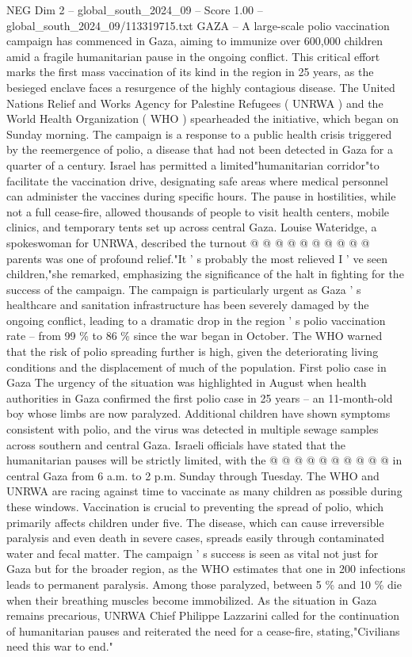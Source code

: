\begin{textsample}{NEG Dim 2 – global\_south\_2024\_09 – Score 1.00 – global\_south\_2024\_09/113319715.txt}  \label{ex:f2_neg_405}
GAZA -- A large-scale polio vaccination campaign has commenced in Gaza, aiming to immunize over 600,000 children amid a fragile humanitarian pause in the ongoing conflict.
This critical effort marks the first mass vaccination of its kind in the region in 25 years, as the besieged enclave faces a resurgence of the highly contagious disease.
The United Nations Relief and Works Agency for Palestine Refugees ( UNRWA ) and the World Health Organization ( WHO ) spearheaded the initiative, which began on Sunday morning.
The campaign is a response to a public health crisis triggered by the reemergence of polio, a disease that had not been detected in Gaza for a quarter of a century.
Israel has permitted a limited"humanitarian corridor"to facilitate the vaccination drive, designating safe areas where medical personnel can administer the vaccines during specific hours.
The pause in hostilities, while not a full cease-fire, allowed thousands of people to visit health centers, mobile clinics, and temporary tents set up across central Gaza.
Louise Wateridge, a spokeswoman for UNRWA, described the turnout @ @ @ @ @ @ @ @ @ @ parents was one of profound relief."It ' s probably the most relieved I ' ve seen children,"she remarked, emphasizing the significance of the halt in fighting for the success of the campaign.
The campaign is particularly urgent as Gaza ' s healthcare and sanitation infrastructure has been severely damaged by the ongoing conflict, leading to a dramatic drop in the region ' s polio vaccination rate -- from 99 \% to 86 \% since the war began in October.
The WHO warned that the risk of polio spreading further is high, given the deteriorating living conditions and the displacement of much of the population.
First polio case in Gaza The urgency of the situation was highlighted in August when health authorities in Gaza confirmed the first polio case in 25 years -- an 11-month-old boy whose limbs are now paralyzed.
Additional children have shown symptoms consistent with polio, and the virus was detected in multiple sewage samples across southern and central Gaza.
Israeli officials have stated that the humanitarian pauses will be strictly limited, with the @ @ @ @ @ @ @ @ @ @ in central Gaza from 6 a.m. to 2 p.m.
Sunday through Tuesday.
The WHO and UNRWA are racing against time to vaccinate as many children as possible during these windows.
Vaccination is crucial to preventing the spread of polio, which primarily affects children under five.
The disease, which can cause irreversible paralysis and even death in severe cases, spreads easily through contaminated water and fecal matter.
The campaign ' s success is seen as vital not just for Gaza but for the broader region, as the WHO estimates that one in 200 infections leads to permanent paralysis.
Among those paralyzed, between 5 \% and 10 \% die when their breathing muscles become immobilized.
As the situation in Gaza remains precarious, UNRWA Chief Philippe Lazzarini called for the continuation of humanitarian pauses and reiterated the need for a cease-fire, stating,"Civilians need this war to end."

\end{textsample}
